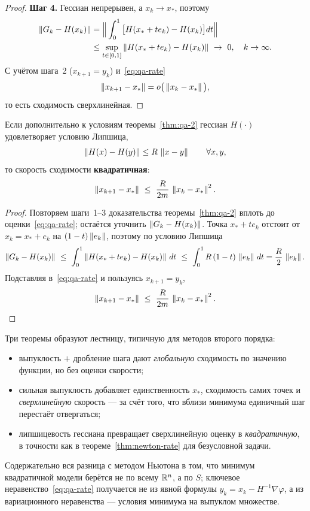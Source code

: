 \begin{idea}[title={Доказательство (на лекции не приводилось)}]
\begin{proof}
\medskip
\textbf{Шаг 4.} Гессиан непрерывен, а $x_k \to x_*$, поэтому
\begin{align*}
  \left\lVert G_k - H(x_k) \right\rVert
  &= \Big\| \int_0^1 \big[H(x_* + t e_k) - H(x_k)\big] dt \Big\| \\
  &\le \sup_{t \in [0,1]} \left\lVert H(x_* + t e_k) - H(x_k) \right\rVert
   \ \to\ 0 , \quad k \to \infty .
\end{align*}
С учётом шага~2 ($x_{k+1} = y_k$) и~\eqref{eq:qa-rate}
\[
  \left\lVert x_{k+1} - x_* \right\rVert = o\big(\left\lVert x_k - x_* \right\rVert\big) ,
\]
то есть сходимость сверхлинейная.
\end{proof}
\end{idea}

\begin{theorem}\label{thm:qa-3}
Если дополнительно к условиям теоремы~\ref{thm:qa-2} гессиан $H(\cdot)$
удовлетворяет условию Липшица,
\[
  \left\lVert H(x) - H(y) \right\rVert \le R\,\left\lVert x - y \right\rVert \qquad \forall x, y ,
\]
то скорость сходимости \textbf{квадратичная}:
\[
  \norm{x_{k+1} - x_*} \ \le\ \frac{R}{2m}\,\norm{x_k - x_*}^2 .
\]
\end{theorem}

\begin{idea}[title={Доказательство (на лекции не приводилось)}]
\begin{proof}
Повторяем шаги~1--3 доказательства теоремы~\ref{thm:qa-2} вплоть
до оценки~\eqref{eq:qa-rate}; остаётся уточнить $\left\lVert G_k - H(x_k) \right\rVert$.
Точка $x_* + t e_k$ отстоит от $x_k = x_* + e_k$ на $(1-t)\left\lVert e_k \right\rVert$, поэтому
по условию Липшица
\[
  \left\lVert G_k - H(x_k) \right\rVert
  \ \le\ \int_0^1 \left\lVert H(x_* + t e_k) - H(x_k) \right\rVert\,dt
  \ \le\ \int_0^1 R\,(1 - t)\,\left\lVert e_k \right\rVert\,dt
  = \frac{R}{2}\,\left\lVert e_k \right\rVert .
\]
Подставляя в~\eqref{eq:qa-rate} и пользуясь $x_{k+1} = y_k$,
\[
  \norm{x_{k+1} - x_*} \ \le\ \frac{R}{2m}\,\norm{x_k - x_*}^2 . \qedhere
\]
\end{proof}
\end{idea}

\begin{idea}
Три теоремы образуют лестницу, типичную для методов второго порядка:
\begin{itemize}[nosep,left=0pt]
  \item выпуклость $+$ дробление шага дают \emph{глобальную} сходимость по
        значению функции, но без оценки скорости;
  \item сильная выпуклость добавляет единственность $x_*$, сходимость самих
        точек и \emph{сверхлинейную} скорость — за счёт того, что вблизи
        минимума единичный шаг перестаёт отвергаться;
  \item липшицевость гессиана превращает сверхлинейную оценку в
        \emph{квадратичную}, в точности как в теореме~\ref{thm:newton-rate}
        для безусловной задачи.
\end{itemize}
Содержательно вся разница с методом Ньютона в том, что минимум квадратичной
модели берётся не по всему $\mathbb{R}^n$, а по $S$; ключевое
неравенство~\eqref{eq:qa-rate} получается не из явной формулы
$y_k = x_k - H^{-1}\nabla\varphi$, а из вариационного неравенства — условия
минимума на выпуклом множестве.
\end{idea}
